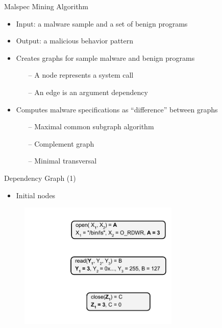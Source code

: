 \documentclass{beamer}
\begin{document}
\begin{frame}{Malspec Mining Algorithm}
  \begin{itemize}
    \item<1-> Input: a malware sample and a set of benign programs
    \item<2-> Output: a malicious behavior pattern
    \item<3-> Creates graphs for sample malware and benign programs
    \begin{itemize}
      \item[--] A node represents a system call
      \item[--] An edge is an argument dependency
    \end{itemize}
    \item<4-> Computes malware specifications as ``difference'' between graphs
    \begin{itemize}
      \item[--] Maximal common subgraph algorithm
      \item[--] Complement graph
      \item[--] Minimal transversal
    \end{itemize}
  \end{itemize}
\end{frame}

\begin{frame}{Dependency Graph (1)}
  \begin{itemize}
    \item Initial nodes
  \end{itemize}
  \begin{figure}[p]
    \includegraphics[width=3in]{img/syscall-dep-graph-0.pdf}
    \end{figure}
\end{frame}
\end{document}
